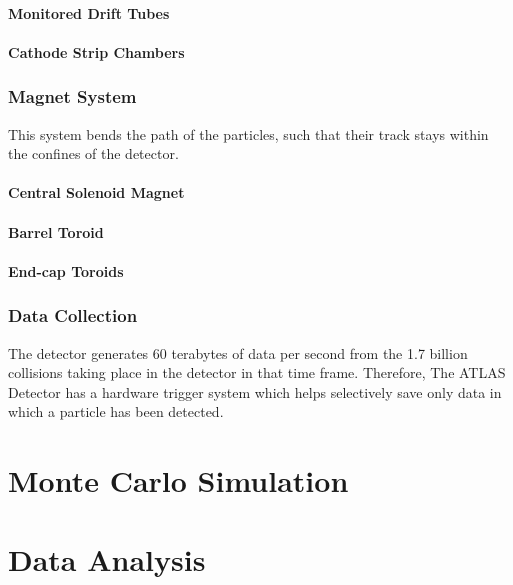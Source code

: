 \documentclass[11pt,a4paper]{article}
\begin{document}
\paragraph{Monitored Drift Tubes}
\paragraph{Cathode Strip Chambers}

\subsubsection{Magnet System}
This system bends the path of the particles, such that their track stays within
the confines of the detector.

\paragraph{Central Solenoid Magnet}
\paragraph{Barrel Toroid}
\paragraph{End-cap Toroids}

\subsubsection{Data Collection}
The detector generates 60 terabytes of data per second from the 1.7 billion
collisions taking place in the detector in that time frame. Therefore, The ATLAS
Detector has a hardware trigger system which helps selectively save only data in
which a particle has been detected.


\section{Monte Carlo Simulation}

\section{Data Analysis}
\end{document}
